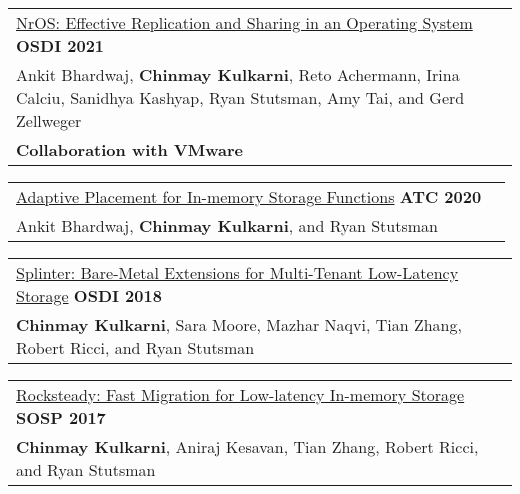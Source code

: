\documentclass[margin,line]{res}
\begin{document}
\begin{resume}
 \vspace{-7pt}
 \begin{tabular}{@{}p{5.5in}p{4in}}
 \href{https://research.vmware.com/projects/bespin}{NrOS: Effective
 Replication and Sharing in an Operating System} \hfill
 {\small\bf OSDI 2021}\\
 {\small Ankit Bhardwaj, {\bf Chinmay Kulkarni}, Reto Achermann, Irina
  Calciu, Sanidhya Kashyap, Ryan Stutsman, Amy Tai, and Gerd Zellweger}\\
 {\small\bf Collaboration with VMware}\\
 \end{tabular}

 \vspace{-7pt}
 \begin{tabular}{@{}p{5.5in}p{4in}}
 \href{http://utah.systems/projects/kulkarni\_splinter}{Adaptive
 Placement for In-memory Storage Functions} \hfill
 {\small\bf ATC 2020}\\
 {\small Ankit Bhardwaj, {\bf Chinmay Kulkarni}, and Ryan Stutsman}\\
 \end{tabular}

 \vspace{-7pt}
 \begin{tabular}{@{}p{5.5in}p{4in}}
 \href{http://utah.systems/projects/kulkarni\_splinter}{Splinter:
 Bare-Metal Extensions for Multi-Tenant Low-Latency Storage} \hfill
 {\small\bf OSDI 2018}\\
 {\small{\bf Chinmay Kulkarni}, Sara Moore, Mazhar Naqvi, Tian Zhang, Robert
 Ricci, and Ryan Stutsman}\\
 \end{tabular}

 \vspace{-7pt}
 \begin{tabular}{@{}p{5.5in}p{4in}}
 \href{http://utah.systems/projects/kulkarni\_rocksteady}{Rocksteady: Fast
 Migration for Low-latency In-memory Storage} \hfill
 {\small\bf SOSP 2017}\\
 {\small{\bf Chinmay Kulkarni}, Aniraj Kesavan, Tian Zhang, Robert
 Ricci, and Ryan Stutsman}\\
 \end{tabular}



\end{resume}
\end{document}
